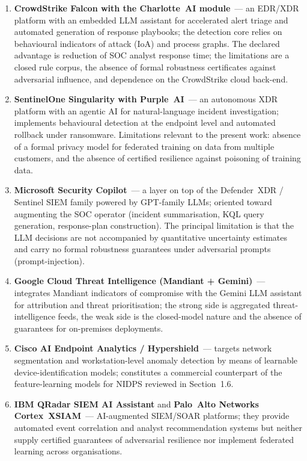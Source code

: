 \iffalse
\begin{enumerate}[leftmargin=2em, itemsep=0pt]

\item \textbf{CrowdStrike Falcon with the Charlotte~AI module}~---
an EDR/XDR platform with an embedded LLM assistant for accelerated
alert triage and automated generation of response playbooks; the
detection core relies on behavioural indicators of attack (IoA)
and process graphs. The declared advantage is reduction of SOC
analyst response time; the limitations are a closed rule corpus,
the absence of formal robustness certificates against adversarial
influence, and dependence on the CrowdStrike cloud back-end.

\item \textbf{SentinelOne Singularity with Purple~AI}~--- an
autonomous XDR platform with an agentic AI for natural-language
incident investigation; implements behavioural detection at the
endpoint level and automated rollback under ransomware. Limitations
relevant to the present work: absence of a formal privacy model
for federated training on data from multiple customers, and the
absence of certified resilience against poisoning of training data.

\item \textbf{Microsoft Security Copilot}~--- a layer on top of
the Defender~XDR / Sentinel SIEM family powered by GPT-family
LLMs; oriented toward augmenting the SOC operator (incident
summarisation, KQL query generation, response-plan construction).
The principal limitation is that the LLM decisions are not
accompanied by quantitative uncertainty estimates and carry no
formal robustness guarantees under adversarial prompts
(prompt-injection).

\item \textbf{Google Cloud Threat Intelligence (Mandiant +
Gemini)}~--- integrates Mandiant indicators of compromise with the
Gemini LLM assistant for attribution and threat prioritisation;
the strong side is aggregated threat-intelligence feeds, the weak
side is the closed-model nature and the absence of guarantees for
on-premises deployments.

\item \textbf{Cisco AI Endpoint Analytics / Hypershield}~---
targets network segmentation and workstation-level anomaly
detection by means of learnable device-identification models;
constitutes a commercial counterpart of the feature-learning
models for NIDPS reviewed in Section~1.6.

\item \textbf{IBM QRadar SIEM AI Assistant} and \textbf{Palo~Alto
Networks Cortex~XSIAM}~--- AI-augmented SIEM/SOAR platforms;
they provide automated event correlation and analyst
recommendation systems but neither supply certified guarantees
of adversarial resilience nor implement federated learning across
organisations.

\end{enumerate}
